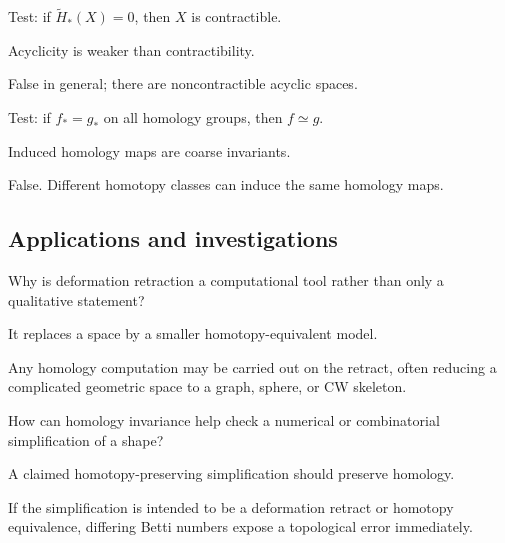\begin{exercise}\label{exr:viii20-ped-11}
Test: if $\widetilde H_*(X)=0$, then $X$ is contractible.
\end{exercise}
\begin{hint}
Acyclicity is weaker than contractibility.
\end{hint}
\begin{solution}
False in general; there are noncontractible acyclic spaces.
\end{solution}

\begin{exercise}\label{exr:viii20-ped-12}
Test: if $f_*=g_*$ on all homology groups, then $f\simeq g$.
\end{exercise}
\begin{hint}
Induced homology maps are coarse invariants.
\end{hint}
\begin{solution}
False. Different homotopy classes can induce the same homology maps.
\end{solution}

\subsection*{Applications and investigations}

\begin{exercise}\label{exr:viii20-ped-13}
Why is deformation retraction a computational tool rather than only a qualitative statement?
\end{exercise}
\begin{hint}
It replaces a space by a smaller homotopy-equivalent model.
\end{hint}
\begin{solution}
Any homology computation may be carried out on the retract, often reducing a complicated geometric space to a graph, sphere, or CW skeleton.
\end{solution}

\begin{exercise}\label{exr:viii20-ped-14}
How can homology invariance help check a numerical or combinatorial simplification of a shape?
\end{exercise}
\begin{hint}
A claimed homotopy-preserving simplification should preserve homology.
\end{hint}
\begin{solution}
If the simplification is intended to be a deformation retract or homotopy equivalence, differing Betti numbers expose a topological error immediately.
\end{solution}

